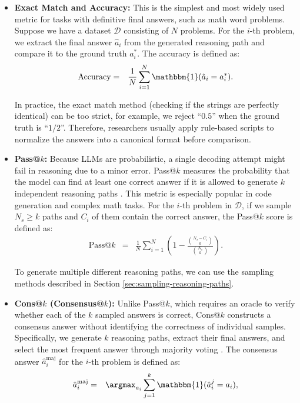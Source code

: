 \begin{itemize}
\item \vspace{0.5em} \textbf{Exact Match and Accuracy:} This is the simplest and most widely used metric for tasks with definitive final answers, such as math word problems. Suppose we have a dataset $\mathcal{D}$ consisting of $N$ problems. For the $i$-th problem, we extract the final answer $\hat{a}_i$ from the generated reasoning path and compare it to the ground truth $a_i^*$. The accuracy is defined as:
\begin{eqnarray}
\text{Accuracy} & = & \frac{1}{N} \sum_{i=1}^N \mathbbm{1}(\hat{a}_i = a^*_i).
\end{eqnarray}

\noindent In practice, the exact match method (checking if the strings are perfectly identical) can be too strict, for example, we reject ``$0.5$'' when the ground truth is ``$1/2$''. Therefore, researchers usually apply rule-based scripts to normalize the answers into a canonical format before comparison.

\item \vspace{0.3em} \textbf{Pass@$k$:} Because LLMs are probabilistic, a single decoding attempt might fail in reasoning due to a minor error. Pass@$k$ measures the probability that the model can find at least one correct answer if it is allowed to generate $k$ independent reasoning paths \cite{chen-etal:2021evaluating}. This metric is especially popular in code generation and complex math tasks. For the $i$-th problem in $\mathcal{D}$, if we sample $N_s \ge k$ paths and $C_i$ of them contain the correct answer, the Pass@$k$ score is defined as:
\begin{eqnarray}
\text{Pass}@k & = &  \frac{1}{N} \sum_{i=1}^N \left( 1 - \frac{\binom{N_s-C_i}{k}}{\binom{N_s}{k}} \right).
\end{eqnarray}

\noindent To generate multiple different reasoning paths, we can use the sampling methods described in Section \ref{sec:sampling-reasoning-paths}.

\item \vspace{0.3em} \textbf{Cons@$k$ (Consensus@$k$):} Unlike Pass@$k$, which requires an oracle to verify whether each of the $k$ sampled answers is correct, Cons@$k$ constructs a consensus answer without identifying the correctness of individual samples. Specifically, we generate $k$ reasoning paths, extract their final answers, and select the most frequent answer through majority voting \cite{wang-etal:2023self}. The consensus answer $\hat{a}_i^{\text{maj}}$ for the $i$-th problem is defined as:
\begin{eqnarray}
\hat{a}_i^{\text{maj}} & = & \argmax_{a_i} \sum_{j=1}^k \mathbbm{1}(\hat{a}_i^j = a_i),
\end{eqnarray}


\end{itemize}
